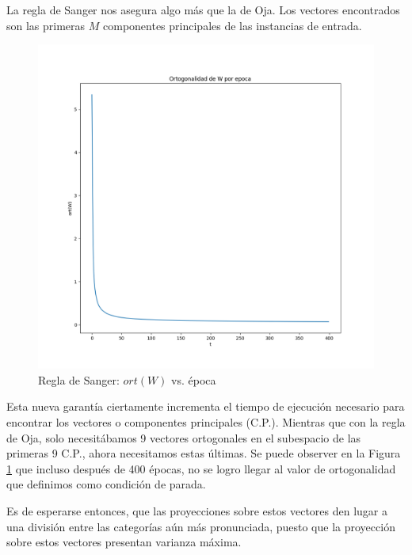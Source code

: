 \documentclass[a4paper,10pt]{article}
\begin{document}
La regla de Sanger nos asegura algo más que la de Oja. Los vectores
encontrados son las primeras $M$ componentes principales de las instancias de
entrada.

\begin{figure}[H]
	\centering
	\includegraphics[width=.7\textwidth]{imgs/sanger-ortw_vs_epocas.png}
	\caption{Regla de Sanger: $ort(W)$ vs. época}
	\label{fig:sanger-ortw_vs_epocas}
\end{figure}

Esta nueva garantía ciertamente incrementa el tiempo de ejecución necesario
para encontrar los vectores o componentes principales (C.P.). Mientras que con la
regla de Oja, solo necesitábamos 9 vectores ortogonales en el subespacio de
las primeras 9 C.P., ahora necesitamos estas últimas. Se puede observer en la
Figura \ref{fig:sanger-ortw_vs_epocas} que incluso después de 400 épocas, no
se logro llegar al valor de ortogonalidad que definimos como condición de
parada.

Es de esperarse entonces, que las proyecciones sobre estos vectores
den lugar a una división entre las categorías aún más pronunciada, puesto que
la proyección sobre estos vectores presentan varianza máxima.
\end{document}
